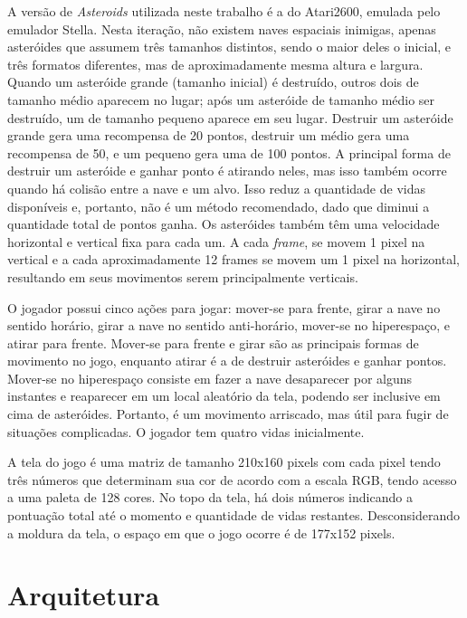 A versão de \textit{Asteroids} utilizada neste trabalho é a do Atari2600, emulada pelo emulador Stella. Nesta iteração, não existem naves espaciais inimigas, apenas asteróides que assumem três tamanhos distintos, sendo o maior deles o inicial, e três formatos diferentes, mas de aproximadamente mesma altura e largura.
Quando um asteróide grande (tamanho inicial) é destruído, outros dois de tamanho médio aparecem no lugar; após um asteróide de tamanho médio ser destruído, um de tamanho pequeno aparece em seu lugar.
Destruir um asteróide grande gera uma recompensa de 20 pontos, destruir um médio gera uma recompensa de 50, e um pequeno gera uma de 100 pontos.
A principal forma de destruir um asteróide e ganhar ponto é atirando neles, mas isso também ocorre quando há colisão entre a nave e um alvo. Isso reduz a quantidade de vidas disponíveis e, portanto, não é um método recomendado, dado que diminui a quantidade total de pontos ganha.
Os asteróides também têm uma velocidade horizontal e vertical fixa para cada um. A cada \textit{frame}, se movem 1 pixel na vertical e a cada aproximadamente 12 frames se movem um 1 pixel na horizontal, resultando em seus movimentos serem principalmente verticais.

O jogador possui cinco ações para jogar: mover-se para frente, girar a nave no sentido horário, girar a nave no sentido anti-horário, mover-se no hiperespaço, e atirar para frente.
Mover-se para frente e girar são as principais formas de movimento no jogo, enquanto atirar é a de destruir asteróides e ganhar pontos.
Mover-se no hiperespaço consiste em fazer a nave desaparecer por alguns instantes e reaparecer em um local aleatório da tela, podendo ser inclusive em cima de asteróides. Portanto, é um movimento arriscado, mas útil para fugir de situações complicadas.
O jogador tem quatro vidas inicialmente.

A tela do jogo é uma matriz de tamanho 210x160 pixels com cada pixel tendo três números que determinam sua cor de acordo com a escala RGB, tendo acesso a uma paleta de 128 cores. No topo da tela, há dois números indicando a pontuação total até o momento e quantidade de vidas restantes. Desconsiderando a moldura da tela, o espaço em que o jogo ocorre é de 177x152 pixels.

\section{Arquitetura}
\label{sec:arq}


